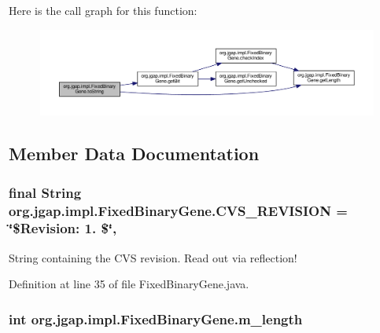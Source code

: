 Here is the call graph for this function\-:
\nopagebreak
\begin{figure}[H]
\begin{center}
\leavevmode
\includegraphics[width=350pt]{classorg_1_1jgap_1_1impl_1_1_fixed_binary_gene_a50ac7f407c3570cecf66f7b423d98187_cgraph}
\end{center}
\end{figure}




\subsection{Member Data Documentation}
\hypertarget{classorg_1_1jgap_1_1impl_1_1_fixed_binary_gene_afabb681b7d100e61d94c79187c136559}{
\subsubsection[{C\-V\-S\-\_\-\-R\-E\-V\-I\-S\-I\-O\-N}]{\setlength{\rightskip}{0pt plus 5cm}final String org.\-jgap.\-impl.\-Fixed\-Binary\-Gene.\-C\-V\-S\-\_\-\-R\-E\-V\-I\-S\-I\-O\-N = \char`\"{}\$Revision\-: 1. \$\char`\"{}\hspace{0.3cm}{\ttfamily [static]}, {\ttfamily [private]}}}\label{classorg_1_1jgap_1_1impl_1_1_fixed_binary_gene_afabb681b7d100e61d94c79187c136559}
String containing the C\-V\-S revision. Read out via reflection! 

Definition at line 35 of file Fixed\-Binary\-Gene.\-java.

\hypertarget{classorg_1_1jgap_1_1impl_1_1_fixed_binary_gene_a6cda273e9ee2b41cb4833b5f9f934846}{
\subsubsection[{m\-\_\-length}]{\setlength{\rightskip}{0pt plus 5cm}int org.\-jgap.\-impl.\-Fixed\-Binary\-Gene.\-m\-\_\-length\hspace{0.3cm}{\ttfamily [private]}}}\label{classorg_1_1jgap_1_1impl_1_1_fixed_binary_gene_a6cda273e9ee2b41cb4833b5f9f934846}


